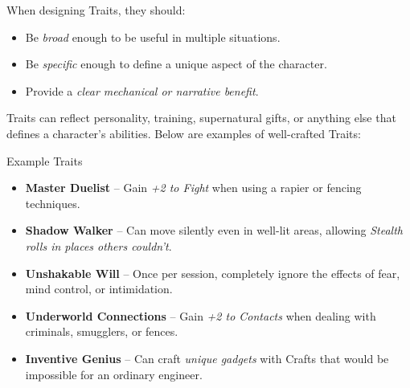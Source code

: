 When designing Traits, they should:
\begin{itemize}
    \item Be \emph{broad} enough to be useful in multiple situations.
    \item Be \emph{specific} enough to define a unique aspect of the character.
    \item Provide a \emph{clear mechanical or narrative benefit}.
\end{itemize}

Traits can reflect personality, training, supernatural gifts, or anything else that defines a character’s abilities. Below are examples of well-crafted Traits:

\begin{DndSidebar}[float=!t]{Example Traits}
    \begin{itemize}
        \item \textbf{Master Duelist} – Gain \emph{+2 to Fight} when using a rapier or fencing techniques.
        \item \textbf{Shadow Walker} – Can move silently even in well-lit areas, allowing \emph{Stealth rolls in places others couldn’t}.
        \item \textbf{Unshakable Will} – Once per session, completely ignore the effects of fear, mind control, or intimidation.
        \item \textbf{Underworld Connections} – Gain \emph{+2 to Contacts} when dealing with criminals, smugglers, or fences.
        \item \textbf{Inventive Genius} – Can craft \emph{unique gadgets} with Crafts that would be impossible for an ordinary engineer.
    \end{itemize}
\end{DndSidebar}

